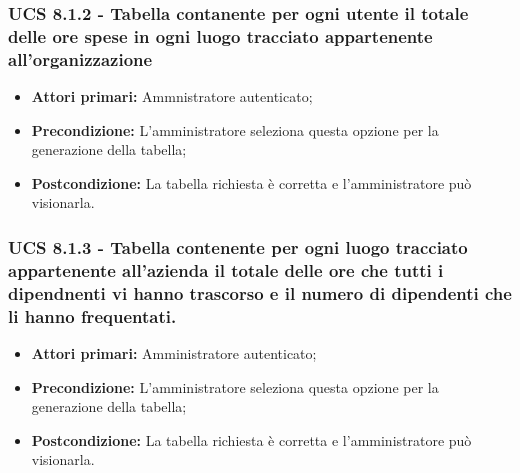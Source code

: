 \subsubsection{UCS 8.1.2 - Tabella contanente per ogni utente il totale delle ore spese in ogni luogo tracciato appartenente all'organizzazione}%
\begin{itemize}
\item \textbf{Attori primari:} Ammnistratore autenticato;
\item \textbf{Precondizione:} L'amministratore seleziona questa opzione per la generazione della tabella;
\item \textbf{Postcondizione:} La tabella richiesta è corretta e l'amministratore può visionarla.
\end{itemize}

\subsubsection{UCS 8.1.3 - Tabella contenente per ogni luogo tracciato appartenente all'azienda il totale delle ore che tutti i dipendnenti vi hanno trascorso e il numero di dipendenti che li hanno frequentati.}%
\begin{itemize}
\item \textbf{Attori primari:} Amministratore autenticato;
\item \textbf{Precondizione:} L'amministratore seleziona questa opzione per la generazione della tabella;
\item \textbf{Postcondizione:} La tabella richiesta è corretta e l'amministratore può visionarla.
\end{itemize}

